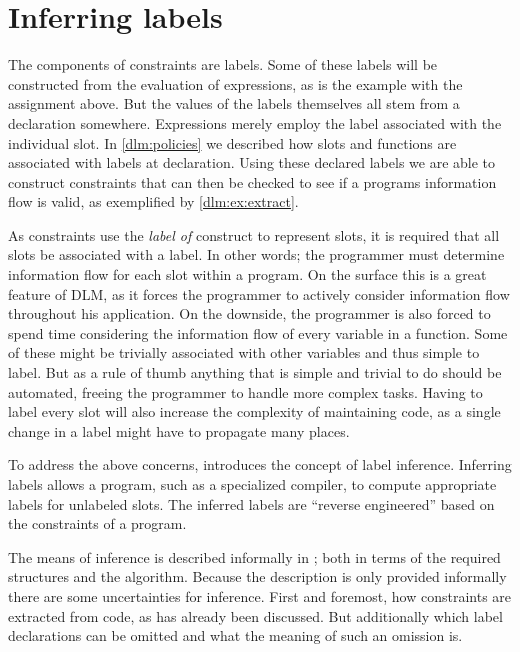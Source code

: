 
\section{Inferring labels}
The components of constraints are labels.
Some of these labels will be constructed from the evaluation of expressions, as is the example with the assignment above.
But the values of the labels themselves all stem from a declaration somewhere.
Expressions merely employ the label associated with the individual slot.
In \cref{dlm:policies} we described how slots and functions are associated with labels at declaration.
Using these declared labels we are able to construct constraints that can then be checked to see if a programs information flow is valid, as exemplified by \cref{dlm:ex:extract}.

As constraints use the \textit{label of} construct to represent slots, it is required that all slots be associated with a label.
In other words; the programmer must determine information flow for each slot within a program.
On the surface this is a great feature of DLM, as it forces the programmer to actively consider information flow throughout his application.
On the downside, the programmer is also forced to spend time considering the information flow of every variable in a function.
Some of these might be trivially associated with other variables and thus simple to label.
But as a rule of thumb anything that is simple and trivial to do should be automated, freeing the programmer to handle more complex tasks.
Having to label every slot will also increase the complexity of maintaining code, as a single change in a label might have to propagate many places.

To address the above concerns, \cite{myers1997} introduces the concept of label inference.
Inferring labels allows a program, such as a specialized compiler, to compute appropriate labels for unlabeled slots.
The inferred labels are ``reverse engineered'' based on the constraints of a program.

The means of inference is described informally in \cite{myers1997}; both in terms of the required structures and the algorithm.
Because the description is only provided informally there are some uncertainties for inference.
First and foremost, how constraints are extracted from code, as has already been discussed.
But additionally which label declarations can be omitted and what the meaning of such an omission is.


